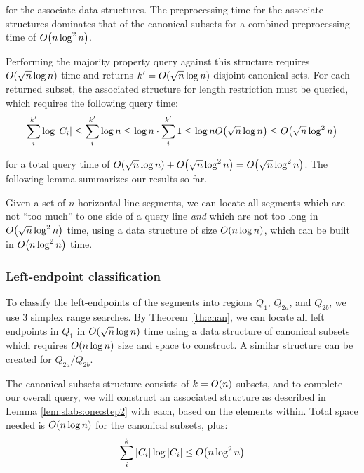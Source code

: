 \noindent for the associate data structures. The preprocessing time for the associate structures dominates that of the canonical subsets for a combined preprocessing time of $O\!\left(n\log^2{n}\right)$.

Performing the majority property query against this structure requires $O\!\left(\sqrt{n}\log{n}\right)$ time and returns $k' = O\!\left(\sqrt{n}\log{n}\right)$ disjoint canonical sets. For each returned subset, the associated structure for length restriction must be queried, which requires the following query time:
\[
\sum_{i}^{k'}{\log{|C_i|}} 
\leq \sum_{i}^{k'}{\log{n}} 
\leq \log{n} \cdot \sum_{i}^{k'}{1}
\leq \log{n} O\!\left(\sqrt{n}\log{n}\right)
\leq O\!\left(\sqrt{n}\log^2{n}\right)
\]

\noindent
for a total query time of $O\!\left(\sqrt{n}\log{n}\right) + O\!\left(\sqrt{n}\log^2{n}\right) = O\!\left(\sqrt{n}\log^2{n}\right)$. The following lemma summarizes our results so far.

\begin{lemma}
\label{lem:slabs:one:step2}
Given a set of $n$ horizontal line segments, we can locate all segments which are not ``too much'' to one side of a query line \emph{and} which are not too long in $O\!\left(\sqrt{n}\log^2{n}\right)$ time, using a data structure of size $O\!\left(n\log{n}\right)$, which can be built in $O\!\left(n\log^2{n}\right)$ time.
\end{lemma}


\subsubsection{Left-endpoint classification}

To classify the left-endpoints of the segments into regions $Q_1$, $Q_{2a}$, and $Q_{2b}$, we use 3 simplex range searches. By Theorem~\ref{th:chan}, we can locate all left endpoints in $Q_1$ in $O\!\left(\sqrt{n}\log{n}\right)$ time using a data structure of canonical subsets which requires $O\!\left(n \log{n}\right)$ size and space to construct. A similar structure can be created for $Q_{2a}/Q_{2b}$.

The canonical subsets structure consists of $k = O\!\left(n\right)$ subsets, and to complete our overall query, we will construct an associated structure as described in Lemma \ref{lem:slabs:one:step2} with each, based on the elements within. Total space needed is $O\!\left(n \log{n}\right)$ for the canonical subsets, plus:
\[
\sum_{i}^{k}{|C_i| \log{|C_i|}} \leq O\!\left(n\log^2{n}\right)
\]

